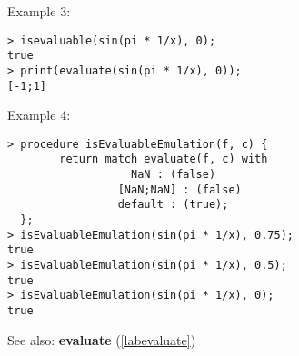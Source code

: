 \noindent Example 3: 
\begin{center}\begin{minipage}{15cm}\begin{Verbatim}[frame=single,commandchars=\\\|\~]
> isevaluable(sin(pi * 1/x), 0);
true
> print(evaluate(sin(pi * 1/x), 0));
[-1;1]
\end{Verbatim}
\end{minipage}\end{center}
\noindent Example 4: 
\begin{center}\begin{minipage}{15cm}\begin{Verbatim}[frame=single,commandchars=\\\|\~]
> procedure isEvaluableEmulation(f, c) {
        return match evaluate(f, c) with 
                   NaN : (false)
                 [NaN;NaN] : (false)
                 default : (true);
  };
> isEvaluableEmulation(sin(pi * 1/x), 0.75);
true
> isEvaluableEmulation(sin(pi * 1/x), 0.5);
true
> isEvaluableEmulation(sin(pi * 1/x), 0);
true
\end{Verbatim}
\end{minipage}\end{center}
See also: \textbf{evaluate} (\ref{labevaluate})
